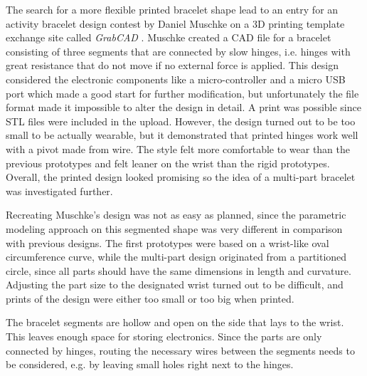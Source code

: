 The search for a more flexible printed bracelet shape lead to an entry for an activity bracelet design contest by Daniel Muschke on a 3D printing template exchange site called \textit{GrabCAD} \cite{amicobracelet}. Muschke created a \ac{CAD} file for a bracelet consisting of three segments that are connected by slow hinges, i.e. hinges with great resistance that do not move if no external force is applied. This design considered the electronic components like a micro-controller and a micro \ac{USB} port which made a good start for further modification, but unfortunately the file format made it impossible to alter the design in detail. A print was possible since \ac{STL} files were included in the upload. However, the design turned out to be too small to be actually wearable, but it demonstrated that printed hinges work well with a pivot made from wire. The style felt more comfortable to wear than the previous prototypes and felt leaner on the wrist than the rigid prototypes. Overall, the printed design looked promising so the idea of a multi-part bracelet was investigated further.

Recreating Muschke's design was not as easy as planned, since the parametric modeling approach on this segmented shape was very different in comparison with previous designs. The first prototypes were based on a wrist-like oval circumference curve, while the multi-part design originated from a partitioned circle, since all parts should have the same dimensions in length and curvature. Adjusting the part size to the designated wrist turned out to be difficult, and prints of the design were either too small or too big when printed.

The bracelet segments are hollow and open on the side that lays to the wrist. This leaves enough space for storing electronics. Since the parts are only connected by hinges, routing the necessary wires between the segments needs to be considered, e.g. by leaving small holes right next to the hinges.

